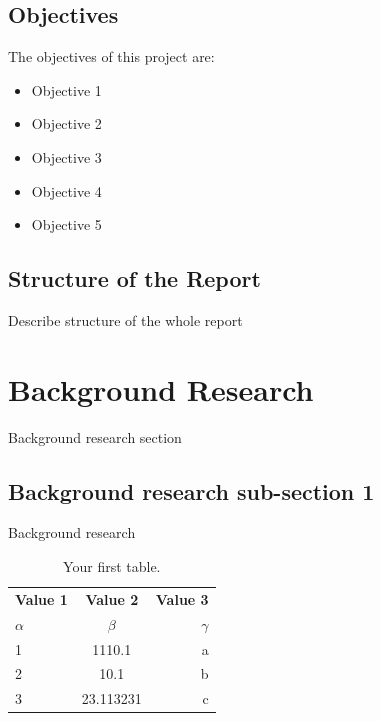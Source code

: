 \documentclass{mscreport}
\begin{document}
\subsection{Objectives}

The objectives of this project are:
\begin{itemize}
  \item Objective 1
  \item Objective 2
  \item Objective 3
  \item Objective 4
  \item Objective 5
\end{itemize}  
  
\subsection{Structure of the Report}

Describe structure of the whole report

\newpage

\section{Background Research}

Background research section

\subsection{Background research sub-section 1}

Background research 

\begin{table}[h!]
  \begin{center}
    \caption{Your first table.}
    \label{tab:table1}
    \begin{tabular}{l|c|r} %
      \textbf{Value 1} & \textbf{Value 2} & \textbf{Value 3}\\
      $\alpha$ & $\beta$ & $\gamma$ \\
      \hline
      1 & 1110.1 & a\\
      2 & 10.1 & b\\
      3 & 23.113231 & c\\
    \end{tabular}
  \end{center}
\end{table}
\end{document}
